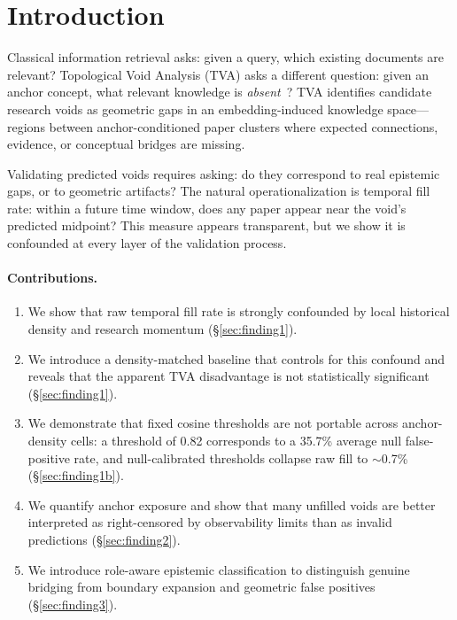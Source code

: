 \documentclass[sigconf]{acmart}
\newcommand{\tva}{\textsf{TVA}}
\begin{document}
\section{Introduction}
\label{sec:intro}

Classical information retrieval asks: given a query, which existing documents are relevant?
Topological Void Analysis (\tva{}) asks a different question: given an anchor concept, what
relevant knowledge is \emph{absent}~\cite{pan2026tva}?
\tva{} identifies candidate research voids as geometric gaps in an embedding-induced
knowledge space---regions between anchor-conditioned paper clusters where expected
connections, evidence, or conceptual bridges are missing.

Validating predicted voids requires asking: do they correspond to real epistemic gaps,
or to geometric artifacts?
The natural operationalization is temporal fill rate: within a future time window,
does any paper appear near the void's predicted midpoint?
This measure appears transparent, but we show it is confounded at every layer of
the validation process.

\paragraph{Contributions.}
\begin{enumerate}
\item We show that raw temporal fill rate is strongly confounded by local historical
  density and research momentum (\S\ref{sec:finding1}).
\item We introduce a density-matched baseline that controls for this confound and
  reveals that the apparent \tva{} disadvantage is not statistically significant
  (\S\ref{sec:finding1}).
\item We demonstrate that fixed cosine thresholds are not portable across
  anchor-density cells: a threshold of 0.82 corresponds to a 35.7\% average null
  false-positive rate, and null-calibrated thresholds collapse raw fill to $\sim$0.7\%
  (\S\ref{sec:finding1b}).
\item We quantify anchor exposure and show that many unfilled voids are better
  interpreted as right-censored by observability limits than as invalid predictions
  (\S\ref{sec:finding2}).
\item We introduce role-aware epistemic classification to distinguish genuine bridging
  from boundary expansion and geometric false positives (\S\ref{sec:finding3}).
\end{enumerate}
\end{document}
